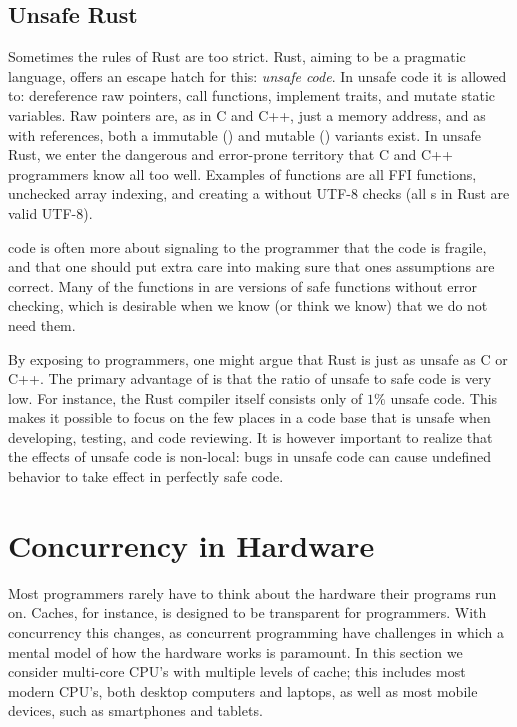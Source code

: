 \documentclass[b5paper]{report}
\begin{document}
\subsection{Unsafe Rust}

Sometimes the rules of Rust are too strict. Rust, aiming to be a pragmatic
language, offers an escape hatch for this: \emph{unsafe code}. In unsafe code it
is allowed to: dereference raw pointers, call  functions, implement
 traits, and mutate static variables. Raw pointers are, as in C and
C++, just a memory address, and as with references, both a immutable
() and mutable () variants exist. In unsafe Rust,
we enter the dangerous and error-prone territory that C and C++ programmers know
all too well. Examples of  functions are all FFI functions,
unchecked array indexing, and creating a  without UTF-8 checks (all
s in Rust are valid UTF-8).

 code is often more about signaling to the programmer
that the code is fragile, and that one should put extra care into making sure
that ones assumptions are correct. Many of the  functions in
 are versions of safe functions without error checking, which is
desirable when we know (or think we know) that we do not need them.

By exposing  to programmers, one might argue that Rust is just as
unsafe as C or C++. The primary advantage of  is that the ratio of
unsafe to safe code is very low. For instance, the Rust compiler itself consists
only of $1\%$ unsafe code\cite{rustc-unsafe}. This makes it possible to focus on
the few places in a code base that is unsafe when developing, testing, and code
reviewing. It is however important to realize that the effects of unsafe code is
non-local: bugs in unsafe code can cause undefined behavior to take effect in
perfectly safe code.



\section{Concurrency in Hardware}

Most programmers rarely have to think about the hardware their programs run on.
Caches, for instance, is designed to be transparent for programmers. With
concurrency this changes, as concurrent programming have challenges in which a
mental model of how the hardware works is paramount. In this section we consider
multi-core CPU's with multiple levels of cache; this includes most modern CPU's,
both desktop computers and laptops, as well as most mobile devices, such as
smartphones and tablets.
\end{document}
